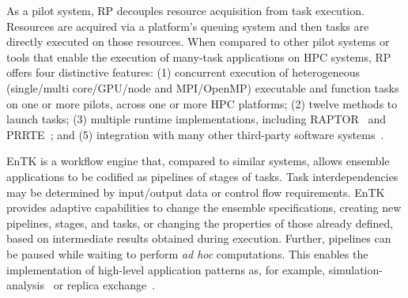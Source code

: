 \documentclass[preprint,12pt, a4paper]{elsarticle}
\begin{document}

As a pilot system, RP decouples resource acquisition from task execution.
Resources are acquired via a platform's queuing system and then tasks are
directly executed on those resources.
%
%
When compared to other pilot systems or tools that enable the execution of
many-task applications on HPC systems, RP offers four distinctive features: (1)
concurrent execution of heterogeneous (single/multi core/GPU/node and
MPI/OpenMP) executable and function tasks on one or more pilots, across one or
more HPC platforms;
(2) twelve methods to launch tasks; (3) multiple runtime implementations,
including RAPTOR~\cite{merzky2022raptor} and
PRRTE~\cite{turilli2019characterizing,titov2022radical}; and (5) integration
with many other third-party software systems~\cite{turilli2019middleware}.


EnTK is a workflow engine that, compared to similar systems, allows ensemble
applications to be codified as pipelines of stages of tasks. Task
interdependencies may be determined by input/output data or control flow
requirements.
%
%
EnTK provides adaptive capabilities to change the ensemble specifications,
creating new pipelines, stages, and tasks, or changing the properties of those
already defined, based on intermediate results obtained during execution.
Further, pipelines can be paused while waiting to perform \textit{ad hoc}
computations. This enables the implementation of high-level application
patterns as, for example,
simulation-analysis~\cite{balasubramanian2016extasy} or replica
exchange~\cite{treikalis2016repex,mushnoori2018repex}.
\end{document}
